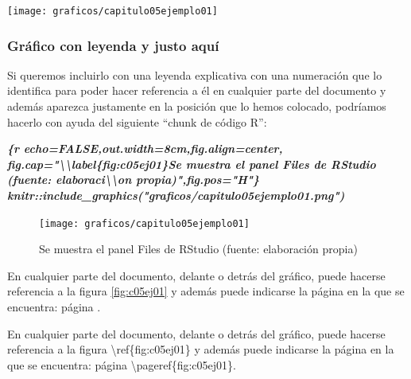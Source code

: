 \documentclass[12pt,a4paper,oneside,]{book}
\newenvironment{Shaded}{\begin{snugshade}}{\end{snugshade}}
\newcommand{\InformationTok}[1]{\textcolor[rgb]{0.56,0.35,0.01}{\textbf{\textit{#1}}}}
\newcommand{\NormalTok}[1]{#1}
\numberwithin{dummy}{section}
\theoremstyle{ocrenumbox}
\theoremstyle{blacknumex}
\theoremstyle{blacknumbox}
\theoremstyle{ocrenum}
\theoremstyle{ocrenum}
\begin{document}
\begin{center}\texttt{[image: graficos/capitulo05ejemplo01]} \end{center}

\hypertarget{gruxe1fico-con-leyenda-y-justo-aquuxed}{%
\subsubsection{Gráfico con leyenda y justo
aquí}\label{gruxe1fico-con-leyenda-y-justo-aquuxed}}

Si queremos incluirlo con una leyenda explicativa con una numeración que
lo identifica para poder hacer referencia a él en cualquier parte del
documento y además aparezca justamente en la posición que lo hemos
colocado, podríamos hacerlo con ayuda del siguiente ``chunk de código
R'':

\begin{Shaded}
\begin{Highlighting}[]
\InformationTok{\textasciigrave{}\textasciigrave{}\textasciigrave{}\{r echo=FALSE,out.width=\textquotesingle{}8cm\textquotesingle{},fig.align=\textquotesingle{}center\textquotesingle{},}
\InformationTok{fig.cap="\textbackslash{}\textbackslash{}label\{fig:c05ej01\}Se muestra el panel Files de RStudio }
\InformationTok{(fuente: elaboraci\textbackslash{}\textbackslash{}\textquotesingle{}on propia)",fig.pos="H"\}}
\InformationTok{knitr::include\_graphics("graficos/capitulo05ejemplo01.png")}
\InformationTok{\textasciigrave{}\textasciigrave{}\textasciigrave{}}
\end{Highlighting}
\end{Shaded}

\begin{figure}[H]

{\centering \texttt{[image: graficos/capitulo05ejemplo01]} 

}

\caption{\label{fig:c05ej01}Se muestra el panel Files de RStudio (fuente: elaboraci\'on propia)}\label{fig:unnamed-chunk-22}
\end{figure}

En cualquier parte del documento, delante o detrás del gráfico, puede
hacerse referencia a la figura \ref{fig:c05ej01} y además puede
indicarse la página en la que se encuentra: página
\pageref{fig:c05ej01}.

\begin{Shaded}
\begin{Highlighting}[]
\NormalTok{En cualquier parte del documento, delante o detrás del gráfico, puede }
\NormalTok{hacerse referencia a la figura \textbackslash{}ref\{fig:c05ej01\} y además puede indicarse }
\NormalTok{la página en la que se encuentra: página \textbackslash{}pageref\{fig:c05ej01\}.}
\end{Highlighting}
\end{Shaded}
\end{document}

